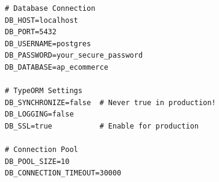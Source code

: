 \documentclass[12pt,a4paper]{report}
\begin{document}
\begin{lstlisting}[caption=Environment Configuration]
# Database Connection
DB_HOST=localhost
DB_PORT=5432
DB_USERNAME=postgres
DB_PASSWORD=your_secure_password
DB_DATABASE=ap_ecommerce

# TypeORM Settings
DB_SYNCHRONIZE=false  # Never true in production!
DB_LOGGING=false
DB_SSL=true           # Enable for production

# Connection Pool
DB_POOL_SIZE=10
DB_CONNECTION_TIMEOUT=30000
\end{lstlisting}

\end{document}
